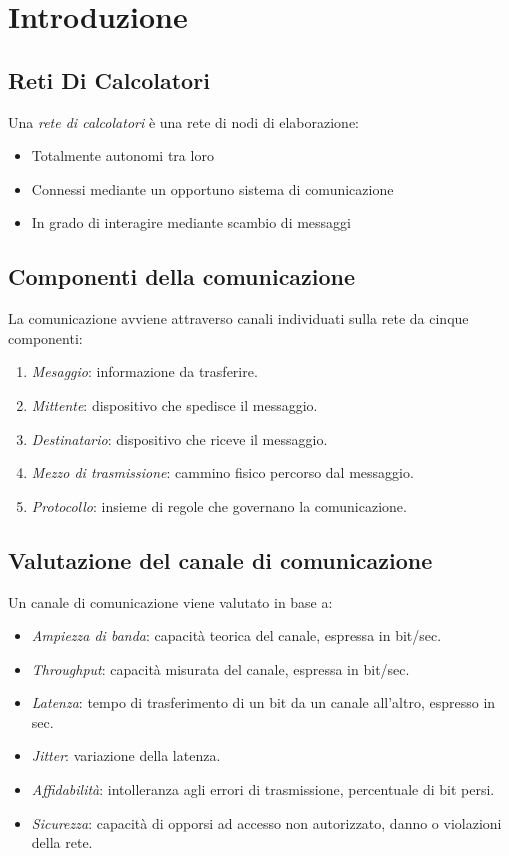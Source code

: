 \section{Introduzione}
    \subsection{Reti Di Calcolatori}
        Una \textit{rete di calcolatori} è una rete di nodi di elaborazione:
        \begin{itemize}
            \item Totalmente autonomi tra loro
            \item Connessi mediante un opportuno sistema di comunicazione
            \item In grado di interagire mediante scambio di messaggi
        \end{itemize}
    
    \subsection{Componenti della comunicazione}
        La comunicazione avviene attraverso canali individuati sulla rete da cinque componenti:
        \begin{enumerate}
            \item \textit{Mesaggio}: informazione da trasferire.
            \item \textit{Mittente}: dispositivo che spedisce il messaggio.
            \item \textit{Destinatario}: dispositivo che riceve il messaggio.
            \item \textit{Mezzo di trasmissione}: cammino fisico percorso dal messaggio.
            \item \textit{Protocollo}: insieme di regole che governano la comunicazione.
        \end{enumerate}
    
    \subsection{Valutazione del canale di comunicazione}
        Un canale di comunicazione viene valutato in base a:
        \begin{itemize}
            \item \textit{Ampiezza di banda}: capacità teorica del canale, espressa in bit/sec.
            \item \textit{Throughput}: capacità misurata del canale, espressa in bit/sec.
            \item \textit{Latenza}: tempo di trasferimento di un bit da un canale all'altro, espresso in sec.
            \item \textit{Jitter}: variazione della latenza.
            \item \textit{Affidabilità}: intolleranza agli errori di trasmissione, percentuale di bit persi.
            \item \textit{Sicurezza}: capacità di opporsi ad accesso non autorizzato, danno o violazioni della rete.
        \end{itemize}

